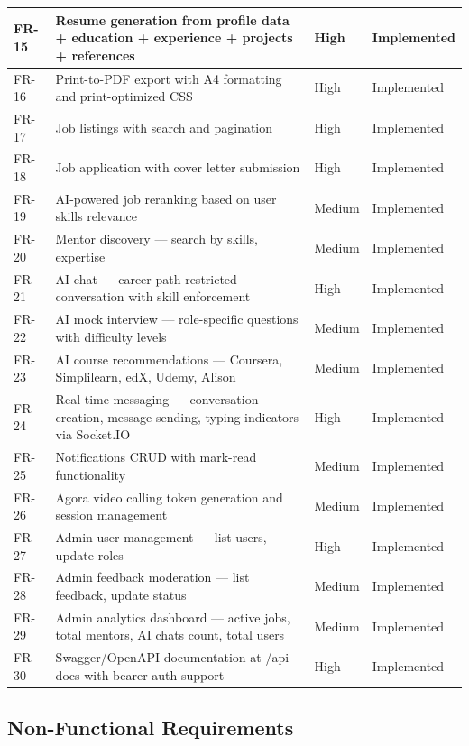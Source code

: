 \documentclass[12pt,a4paper]{report}
\begin{document}
\begin{longtable}{|p{0.8cm}|p{6cm}|p{3cm}|p{3cm}|}
\hline
FR-15 & Resume generation from profile data + education + experience + projects + references & High & Implemented \\
\hline
FR-16 & Print-to-PDF export with A4 formatting and print-optimized CSS & High & Implemented \\
\hline
FR-17 & Job listings with search and pagination & High & Implemented \\
\hline
FR-18 & Job application with cover letter submission & High & Implemented \\
\hline
FR-19 & AI-powered job reranking based on user skills relevance & Medium & Implemented \\
\hline
FR-20 & Mentor discovery — search by skills, expertise & Medium & Implemented \\
\hline
FR-21 & AI chat — career-path-restricted conversation with skill enforcement & High & Implemented \\
\hline
FR-22 & AI mock interview — role-specific questions with difficulty levels & Medium & Implemented \\
\hline
FR-23 & AI course recommendations — Coursera, Simplilearn, edX, Udemy, Alison & Medium & Implemented \\
\hline
FR-24 & Real-time messaging — conversation creation, message sending, typing indicators via Socket.IO & High & Implemented \\
\hline
FR-25 & Notifications CRUD with mark-read functionality & Medium & Implemented \\
\hline
FR-26 & Agora video calling token generation and session management & Medium & Implemented \\
\hline
FR-27 & Admin user management — list users, update roles & High & Implemented \\
\hline
FR-28 & Admin feedback moderation — list feedback, update status & Medium & Implemented \\
\hline
FR-29 & Admin analytics dashboard — active jobs, total mentors, AI chats count, total users & Medium & Implemented \\
\hline
FR-30 & Swagger/OpenAPI documentation at /api-docs with bearer auth support & High & Implemented \\
\hline
\end{longtable}

\subsection{Non-Functional Requirements}
\end{document}
